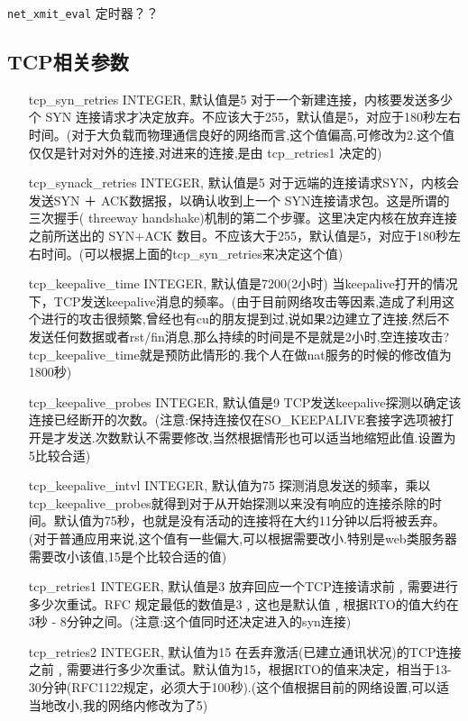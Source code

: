     \texttt{net_xmit_eval}   定时器？？
    \subsection{TCP相关参数}
\begin{enumerate}
\item[tcp\_syn\_retries]  INTEGER,
默认值是5
对于一个新建连接，内核要发送多少个 SYN 连接请求才决定放弃。不应该大于255，默认值是5，对应于180秒左右时间。(对于大负载而物理通信良好的网络而言,这个值偏高,可修改为2.这个值仅仅是针对对外的连接,对进来的连接,是由
tcp\_retries1 决定的)

\item[tcp\_synack\_retries] INTEGER,
默认值是5
对于远端的连接请求SYN，内核会发送SYN ＋ ACK数据报，以确认收到上一个 SYN连接请求包。这是所谓的三次握手( threeway handshake)机制的第二个步骤。这里决定内核在放弃连接之前所送出的 SYN+ACK 数目。不应该大于255，默认值是5，对应于180秒左右时间。(可以根据上面的tcp\_syn\_retries来决定这个值)

\item[tcp\_keepalive\_time] INTEGER,
默认值是7200(2小时)
当keepalive打开的情况下，TCP发送keepalive消息的频率。(由于目前网络攻击等因素,造成了利用这个进行的攻击很频繁,曾经也有cu的朋友提到过,说如果2边建立了连接,然后不发送任何数据或者rst/fin消息,那么持续的时间是不是就是2小时,空连接攻击?tcp\_keepalive\_time就是预防此情形的.我个人在做nat服务的时候的修改值为1800秒)

\item[tcp\_keepalive\_probes] INTEGER,
默认值是9
TCP发送keepalive探测以确定该连接已经断开的次数。(注意:保持连接仅在SO\_KEEPALIVE套接字选项被打开是才发送.次数默认不需要修改,当然根据情形也可以适当地缩短此值.设置为5比较合适)

\item[tcp\_keepalive\_intvl] INTEGER,
默认值为75
探测消息发送的频率，乘以tcp\_keepalive\_probes就得到对于从开始探测以来没有响应的连接杀除的时间。默认值为75秒，也就是没有活动的连接将在大约11分钟以后将被丢弃。(对于普通应用来说,这个值有一些偏大,可以根据需要改小.特别是web类服务器需要改小该值,15是个比较合适的值)

\item[tcp\_retries1] INTEGER,
默认值是3
放弃回应一个TCP连接请求前﹐需要进行多少次重试。RFC 规定最低的数值是3﹐这也是默认值﹐根据RTO的值大约在3秒 - 8分钟之间。(注意:这个值同时还决定进入的syn连接)

\item[tcp\_retries2] INTEGER,
默认值为15
在丢弃激活(已建立通讯状况)的TCP连接之前﹐需要进行多少次重试。默认值为15，根据RTO的值来决定，相当于13-30分钟(RFC1122规定，必须大于100秒).(这个值根据目前的网络设置,可以适当地改小,我的网络内修改为了5)


\end{enumerate}
